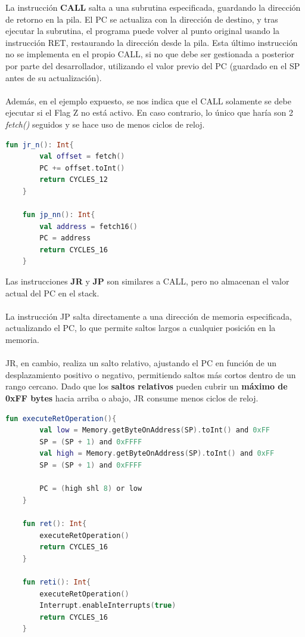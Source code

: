 La instrucción \textbf{CALL} salta a una subrutina especificada, guardando la dirección de retorno en la pila. El PC se actualiza con la dirección de destino, y tras ejecutar la subrutina, el programa puede volver al punto original usando la instrucción RET, restaurando la dirección desde la pila. Esta último instrucción no se implementa en el propio CALL, si no que debe ser gestionada a posterior por parte del desarrollador, utilizando el valor previo del PC (guardado en el SP antes de su actualización).
\\\\
Además, en el ejemplo expuesto, se nos indica que el CALL solamente se debe ejecutar si el Flag Z no está activo. En caso contrario, lo único que haría son 2 \textit{fetch()} seguidos y se hace uso de menos ciclos de reloj.

\begin{lstlisting}[language=Kotlin, caption={Operaciones JR y JP}, label={code:kotlinjpjr}]
    fun jr_n(): Int{
        val offset = fetch()
        PC += offset.toInt()
        return CYCLES_12
    }

    fun jp_nn(): Int{
        val address = fetch16()
        PC = address
        return CYCLES_16
    }
\end{lstlisting}

Las instrucciones \textbf{JR} y \textbf{JP} son similares a CALL, pero no almacenan el valor actual del PC en el stack. 
\\\\
La instrucción JP salta directamente a una dirección de memoria especificada, actualizando el PC, lo que permite saltos largos a cualquier posición en la memoria. 
\\\\
JR, en cambio, realiza un salto relativo, ajustando el PC en función de un desplazamiento positivo o negativo, permitiendo saltos más cortos dentro de un rango cercano. Dado que los \textbf{saltos relativos} pueden cubrir un \textbf{máximo de 0xFF bytes} hacia arriba o abajo, JR consume menos ciclos de reloj.

\begin{lstlisting}[language=Kotlin, caption={Operaciones RET y RETI}, label={code:kotlinreti}]
    fun executeRetOperation(){
        val low = Memory.getByteOnAddress(SP).toInt() and 0xFF
        SP = (SP + 1) and 0xFFFF
        val high = Memory.getByteOnAddress(SP).toInt() and 0xFF
        SP = (SP + 1) and 0xFFFF

        PC = (high shl 8) or low
    }

    fun ret(): Int{
        executeRetOperation()
        return CYCLES_16
    }

    fun reti(): Int{
        executeRetOperation()
        Interrupt.enableInterrupts(true)
        return CYCLES_16
    }
\end{lstlisting}

